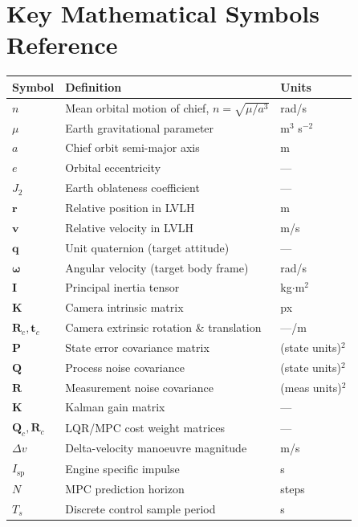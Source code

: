 \documentclass[12pt, a4paper]{article}
\newcommand{\vr}{\mathbf{r}}
\newcommand{\vv}{\mathbf{v}}
\newcommand{\vq}{\mathbf{q}}
\newcommand{\vw}{\bm{\omega}}
\newcommand{\mP}{\mathbf{P}}
\newcommand{\mQ}{\mathbf{Q}}
\newcommand{\mR}{\mathbf{R}}
\newcommand{\mK}{\mathbf{K}}
\newcommand{\Deltav}{\Delta v}
\newcommand{\Isp}{I_{\mathrm{sp}}}
\begin{document}
\section{Key Mathematical Symbols Reference}

\begin{longtable}{@{}lp{9cm}l@{}}
\toprule
\textbf{Symbol} & \textbf{Definition} & \textbf{Units} \\
\midrule
\endhead
$n$ & Mean orbital motion of chief, $n = \sqrt{\mu/a^3}$ & rad/s \\
$\mu$ & Earth gravitational parameter & m$^3$ s$^{-2}$ \\
$a$ & Chief orbit semi-major axis & m \\
$e$ & Orbital eccentricity & --- \\
$J_2$ & Earth oblateness coefficient & --- \\
$\vr$ & Relative position in LVLH & m \\
$\vv$ & Relative velocity in LVLH & m/s \\
$\vq$ & Unit quaternion (target attitude) & --- \\
$\vw$ & Angular velocity (target body frame) & rad/s \\
$\mathbf{I}$ & Principal inertia tensor & kg$\cdot$m$^2$ \\
$\mathbf{K}$ & Camera intrinsic matrix & px \\
$\mathbf{R}_c, \mathbf{t}_c$ & Camera extrinsic rotation \& translation & ---/m \\
$\mP$ & State error covariance matrix & (state units)$^2$ \\
$\mQ$ & Process noise covariance & (state units)$^2$ \\
$\mR$ & Measurement noise covariance & (meas units)$^2$ \\
$\mK$ & Kalman gain matrix & --- \\
$\mathbf{Q}_c, \mathbf{R}_c$ & LQR/MPC cost weight matrices & --- \\
$\Deltav$ & Delta-velocity manoeuvre magnitude & m/s \\
$\Isp$ & Engine specific impulse & s \\
$N$ & MPC prediction horizon & steps \\
$T_s$ & Discrete control sample period & s \\
\bottomrule
\end{longtable}

\end{document}
